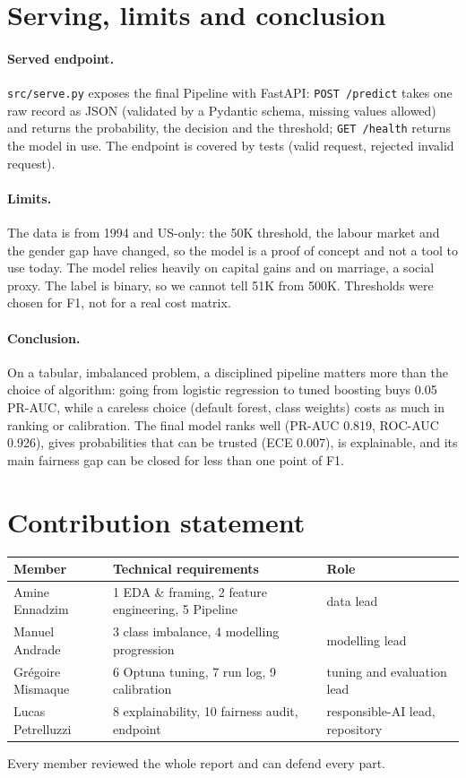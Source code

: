 \documentclass[11pt,a4paper]{article}
\newcommand{\code}[1]{\texttt{#1}}
\begin{document}
\section{Serving, limits and conclusion}

\paragraph{Served endpoint.} \code{src/serve.py} exposes the final Pipeline with FastAPI:
\code{POST /predict} takes one raw record as JSON (validated by a Pydantic schema, missing values
allowed) and returns the probability, the decision and the threshold; \code{GET /health} returns the
model in use. The endpoint is covered by tests (valid request, rejected invalid request).

\paragraph{Limits.} The data is from 1994 and US-only: the 50K threshold, the labour market and the
gender gap have changed, so the model is a proof of concept and not a tool to use today. The model
relies heavily on capital gains and on marriage, a social proxy. The label is binary, so we cannot
tell 51K from 500K. Thresholds were chosen for F1, not for a real cost matrix.

\paragraph{Conclusion.} On a tabular, imbalanced problem, a disciplined pipeline matters more than
the choice of algorithm: going from logistic regression to tuned boosting buys 0.05 PR-AUC, while
a careless choice (default forest, class weights) costs as much in ranking or calibration. The final
model ranks well (PR-AUC 0.819, ROC-AUC 0.926), gives probabilities that can be trusted (ECE 0.007),
is explainable, and its main fairness gap can be closed for less than one point of F1.

\section*{Contribution statement}
\begin{table}[H]\centering\small
\begin{tabular}{lll}\toprule
Member & Technical requirements & Role\\\midrule
Amine Ennadzim & 1 EDA \& framing, 2 feature engineering, 5 Pipeline & data lead\\
Manuel Andrade & 3 class imbalance, 4 modelling progression & modelling lead\\
Gr\'egoire Mismaque & 6 Optuna tuning, 7 run log, 9 calibration & tuning and evaluation lead\\
Lucas Petrelluzzi & 8 explainability, 10 fairness audit, endpoint & responsible-AI lead, repository\\\bottomrule
\end{tabular}
\end{table}
\noindent Every member reviewed the whole report and can defend every part.
\end{document}
